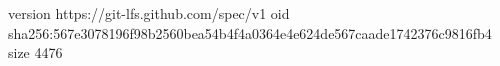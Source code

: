 version https://git-lfs.github.com/spec/v1
oid sha256:567e3078196f98b2560bea54b4f4a0364e4e624de567caade1742376c9816fb4
size 4476
